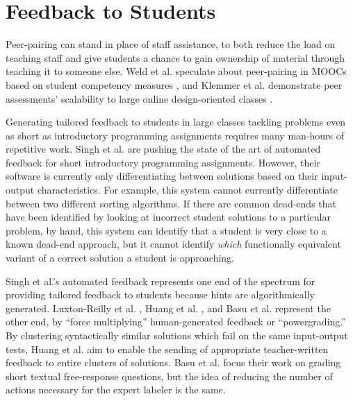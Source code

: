\section{Feedback to Students}

Peer-pairing can stand in place of staff assistance, to both reduce the load on teaching staff and give students a chance to gain ownership of material through teaching it to someone else. Weld et al. speculate about peer-pairing in MOOCs based on student competency measures \cite{WeldHcomp12}, and Klemmer et al. demonstrate peer assessments' scalability to large online design-oriented classes \cite{Klemmer}.

Generating tailored feedback to students in large classes tackling problems even as short as introductory programming assignments requires many man-hours of repetitive work. Singh et al. \cite{rishabh} are pushing the state of the art of automated feedback for short introductory programming assignments. However, their software is currently only differentiating between solutions based on their input-output characteristics. For example, this system cannot currently differentiate between two different sorting algorithms. If there are common dead-ends that have been identified by looking at incorrect student solutions to a particular problem, by hand, this system can identify that a student is very close to a known dead-end approach, but it cannot identify {\em which} functionally equivalent variant of a correct solution a student is approaching. 

Singh et al.'s automated feedback represents one end of the spectrum for providing tailored feedback to students because hints are algorithmically generated. Luxton-Reilly et al. \cite{Luxton13}, Huang et al. \cite{MOOCshop}, and Basu et al. \cite{basupowergrading} represent the other end, by ``force multiplying'' human-generated feedback or ``powergrading.'' By clustering syntactically similar solutions which fail on the same input-output tests, Huang et al. aim to enable the sending of appropriate teacher-written feedback to entire clusters of solutions. Basu et al. \cite{basupowergrading} focus their work on grading short textual free-response questions, but the idea of reducing the number of actions necessary for the expert labeler is the same.

%

